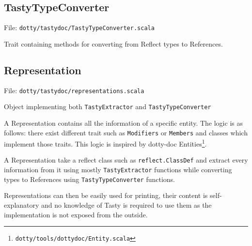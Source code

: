 \documentclass{report}
\begin{document}
\subsection{TastyTypeConverter}
File: \texttt{dotty/tastydoc/TastyTypeConverter.scala}

Trait containing methods for converting from Reflect types to References.

\subsection{Representation}
\label{sec:representation}
File: \texttt{dotty/tastydoc/representations.scala}

Object implementing both \texttt{TastyExtractor} and \texttt{TastyTypeConverter}

A Representation contains all the information of a specific entity. The logic is as follows: there exist different trait such as \texttt{Modifiers} or \texttt{Members} and classes which implement those traits. This logic is inspired by dotty-doc Entities\footnote{\texttt{dotty/tools/dottydoc/Entity.scala}}.

A Representation take a reflect class such as \texttt{reflect.ClassDef} and extract every information from it using mostly \texttt{TastyExtractor} functions while converting types to References using \texttt{TastyTypeConverter} functions.

Representations can then be easily used for printing, their content is self-explanatory and no knowledge of Tasty is required to use them as the implementation is not exposed from the outside.
\end{document}
